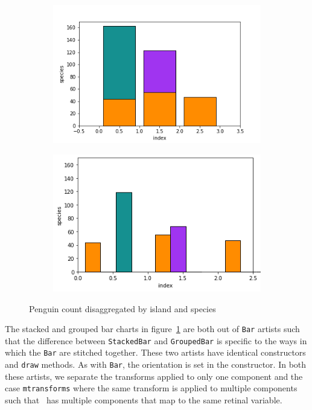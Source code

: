 \documentclass[../main.tex]{subfiles}
\begin{document}
\begin{figure}[H]
    \begin{subfigure}{0.5\textwidth}
        \includegraphics[width=\textwidth]{figures/code/bar_stacked.png}
        \caption{}
    \end{subfigure}
    \begin{subfigure}{0.5\textwidth}
        \includegraphics[width=\textwidth]{figures/code/bar_grouped.png}
        \caption{}
    \end{subfigure}
    \caption{Penguin count disaggregated by island and species}
    \label{fig:code_bar_multi}
\end{figure}
The stacked and grouped bar charts in figure~\ref{fig:code_bar_multi} are both out of \texttt{Bar} artists such that the difference between \texttt{StackedBar} and \texttt{GroupedBar} is specific to the ways in which the \texttt{Bar} are stitched together. These two artists have identical constructors and \texttt{draw} methods. As with \texttt{Bar}, the orientation is set in the constructor. In both these artists, we separate the transforms applied to only one component and the case \texttt{mtransforms} where the same transform is applied to multiple components such that \vtotal\ has multiple components that map to the same retinal variable. 
\end{document}
